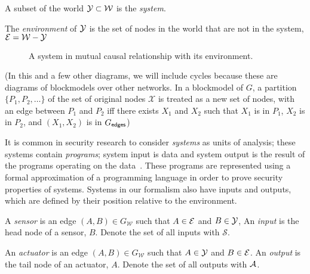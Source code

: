 \documentclass[../thesis.tex]{subfiles}
\newcommand{\W}{\mathcal{W}} %
\begin{document}
\begin{dfn}[System]
  A subset of the world $\Y \subset \W$ is the \emph{system}.
\end{dfn}


\begin{dfn}[Environment]
  The \emph{environment} of $\mathcal{Y}$ is the set of 
  nodes in the world that are not in the system,
  $\mathcal{E} = \W - \Y$ 
\end{dfn}

\begin{figure}
\begin{center}
\end{center}
\caption{A system in mutual causal relationship with its environment.}
\end{figure}

(In this and a few other diagrams, we will include cycles because
these are diagrams of blockmodels over other networks.
In a blockmodel of $G$, a partition $\{P_1, P_2, \ldots\}$ of the set
of original nodes $\mathcal{X}$ is treated as a new set of nodes,
with an edge between $P_1$ and $P_2$ iff
there exists $X_1$ and $X_2$ such that $X_1$ is in $P_1$, $X_2$ is in $P_2$, and $(X_1,X_2)$ is in $G_{\mathsf{edges}}$)

It is common in security research to consider \emph{systems}
as units of analysis; these systems contain \emph{programs}; system
input is data and system output is the result of the programs
operating on the data~\cite{mclean90sp}.
These programs are represented using a formal approximation of a
programming language
in order to prove security properties of systems.
Systems in our formalism also have inputs and outputs,
which are defined by their position relative
to the environment.

\begin{dfn}
  A \emph{sensor} is an edge $(A,B) \in G_\W$
  such that $A \in \mathcal{E}$ and $B \in \mathcal{Y}$,
  An \emph{input} is the head node of a sensor, $B$.
  Denote the set of all inputs with $\mathcal{S}$.
\end{dfn}

%
%

\begin{dfn}
  An \emph{actuator} is an edge $(A,B) \in G_\W$ such
  that $A \in \mathcal{Y}$ and $B \in \mathcal{E}$.
  An \emph{output} is the tail node of an actuator, $A$.
  Denote the set of all outputs with $\mathcal{A}$.
\end{dfn}
\end{document}

